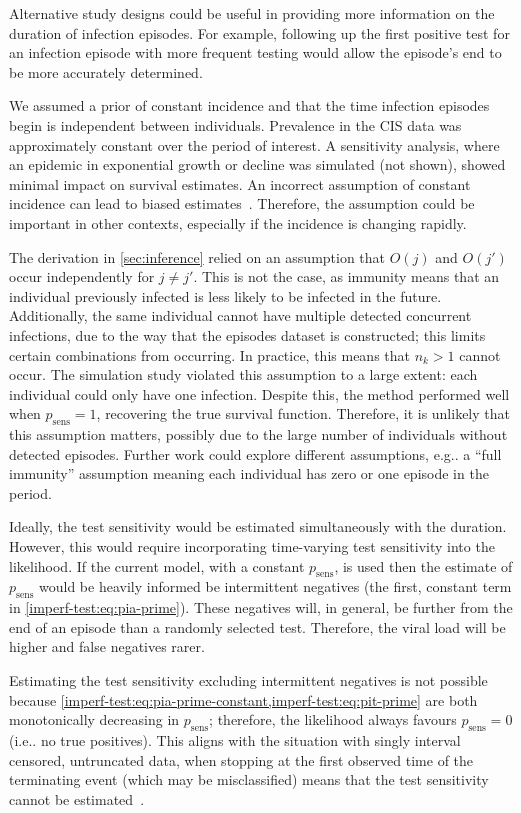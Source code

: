 \documentclass[12pt]{article}
\makeatletter
\newcommand{\psens}{p_\text{sens}}
\DeclareRobustCommand\onedot{\futurelet\@let@token\@onedot}
\def\@onedot{\ifx\@let@token.\else.\null\fi\xspace}
\def\eg{e.g\onedot} \def\Eg{{E.g}\onedot}
\def\ie{i.e\onedot} \def\Ie{{I.e}\onedot}
\makeatother
\begin{document}
Alternative study designs could be useful in providing more information on the duration of infection episodes.
For example, following up the first positive test for an infection episode with more frequent testing would allow the episode's end to be more accurately determined.

We assumed a prior of constant incidence and that the time infection episodes begin is independent between individuals.
Prevalence in the CIS data was approximately constant over the period of interest.
A sensitivity analysis, where an epidemic in exponential growth or decline was simulated (not shown), showed minimal impact on survival estimates.
An incorrect assumption of constant incidence can lead to biased estimates~\citep{degruttolaAnalysis}.
Therefore, the assumption could be important in other contexts, especially if the incidence is changing rapidly.


The derivation in \cref{sec:inference} relied on an assumption that $O(j)$ and $O(j')$ occur independently for $j \neq j'$.
This is not the case, as immunity means that an individual previously infected is less likely to be infected in the future.
Additionally, the same individual cannot have multiple detected concurrent infections, due to the way that the episodes dataset is constructed; this limits certain combinations from occurring.
In practice, this means that $n_k > 1$ cannot occur.
The simulation study violated this assumption to a large extent: each individual could only have one infection.
Despite this, the method performed well when $\psens = 1$, recovering the true survival function.
Therefore, it is unlikely that this assumption matters, possibly due to the large number of individuals without detected episodes.
Further work could explore different assumptions, \eg a ``full immunity'' assumption meaning each individual has zero or one episode in the period.

Ideally, the test sensitivity would be estimated simultaneously with the duration.
However, this would require incorporating time-varying test sensitivity into the likelihood.
If the current model, with a constant $\psens$, is used then the estimate of $\psens$ would be heavily informed be intermittent negatives (the first, constant term in \cref{imperf-test:eq:pia-prime}).
These negatives will, in general, be further from the end of an episode than a randomly selected test.
Therefore, the viral load will be higher and false negatives rarer.

Estimating the test sensitivity excluding intermittent negatives is not possible because \cref{imperf-test:eq:pia-prime-constant,imperf-test:eq:pit-prime} are both monotonically decreasing in $\psens$; therefore, the likelihood always favours $\psens = 0$ (\ie no true positives).
This aligns with the situation with singly interval censored, untruncated data, when stopping at the first observed time of the terminating event (which may be misclassified) means that the test sensitivity cannot be estimated~\citep[e.g.]{titmanMisclassify}.
\end{document}
